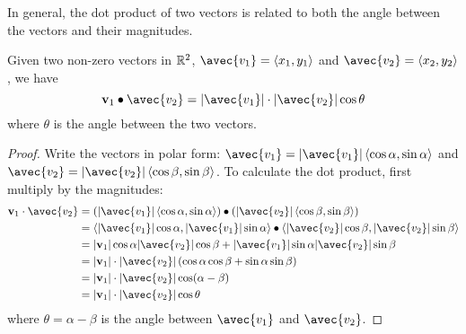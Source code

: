 \documentclass[handout]{ximera}
\begin{document}
\begin{image}
\end{image}

In general, the dot product of two vectors is related to both the angle between the vectors and their magnitudes.

\begin{proposition}
Given two non-zero vectors in $\mathbb R^2$, $\avec{v_1} = \vector{x_1, y_1}$ and $\avec{v_2} = \vector{x_2, y_2}$, we have
\[
\vec{v}_1 \dotp \avec{v_2} = |\avec{v_1}| \cdot |\avec{v_2}| \cos \theta
\]
where $\theta$ is the angle between the two vectors.
\begin{proof}
Write the vectors in polar form: $\avec{v_1} = |\avec{v_1}| \vector{\cos \alpha, \sin \alpha}$ and 
$\avec{v_2} = |\avec{v_2}| \vector{\cos \beta, \sin \beta}$. To calculate the dot product, first multiply by the magnitudes:
\begin{align*}
\vec{v}_1 \cdot \avec{v_2} & = \left(|\avec{v_1}| \vector{\cos \alpha, \sin \alpha}\right) \dotp \left( |\avec{v_2}| \vector{\cos \beta, \sin \beta} \right)\\
                            &= \vector{|\avec{v_1}|\cos \alpha, |\avec{v_1}|\sin \alpha} \dotp   \vector{|\avec{v_2}|\cos \beta, |\avec{v_2}|\sin \beta} \\
                            &= |\vec{v}_1| \cos \alpha |\avec{v_2}|\cos \beta + |\avec{v_1}|\sin \alpha |\avec{v_2}|\sin \beta\\
                            &= |\vec{v}_1|\cdot |\avec{v_2}| \left(\cos \alpha \cos \beta + \sin \alpha \sin \beta\right)\\
                            &= |\vec{v}_1| \cdot|\avec{v_2}| \cos(\alpha - \beta)\\
                            &= |\vec{v}_1| \cdot |\avec{v_2}| \cos \theta
\end{align*}
where $\theta = \alpha - \beta$ is the angle between $\avec{v_1}$ and $\avec{v_2}$.
\end{proof}
\end{proposition}
\end{document}
